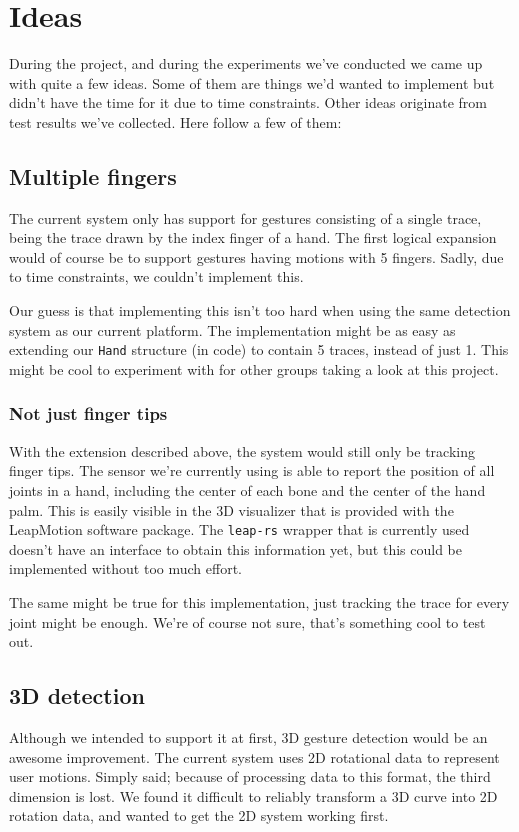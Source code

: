 \documentclass[a4paper]{article}
\begin{document}
  \section*{Ideas}
  During the project, and during the experiments we've conducted we came up with
  quite a few ideas. Some of them are things we'd wanted to implement but didn't
  have the time for it due to time constraints. Other ideas originate from
  test results we've collected.
  Here follow a few of them:

  \subsection*{Multiple fingers}
  The current system only has support for gestures consisting of a single trace,
  being the trace drawn by the index finger of a hand. The first logical
  expansion would of course be to support gestures having motions with 5
  fingers. Sadly, due to time constraints, we couldn't implement this.

  Our guess is that implementing this isn't too hard when using the same
  detection system as our current platform. The implementation might be as easy
  as extending our \verb_Hand_ structure (in code) to contain 5 traces, instead
  of just 1. This might be cool to experiment with for other groups taking a
  look at this project.

  \subsubsection*{Not just finger tips}
  With the extension described above, the system would still only be tracking
  finger tips. The sensor we're currently using is able to report the position
  of all joints in a hand, including the center of each bone and the center of
  the hand palm. This is easily visible in the 3D visualizer that is provided
  with the LeapMotion software package. The \verb_leap-rs_ wrapper that is
  currently used doesn't have an interface to obtain this information yet,
  but this could be implemented without too much effort.

  The same might be true for this implementation, just tracking the trace for
  every joint might be enough. We're of course not sure, that's something cool
  to test out.

  \subsection*{3D detection}
  Although we intended to support it at first, 3D gesture detection would be an
  awesome improvement. The current system uses 2D rotational data to represent
  user motions. Simply said; because of processing data to this format, the
  third dimension is lost. We found it difficult to reliably transform a 3D
  curve into 2D rotation data, and wanted to get the 2D system working first.
\end{document}
